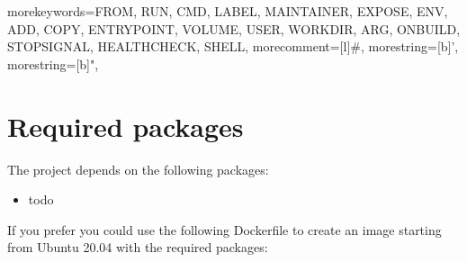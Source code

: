 {
  morekeywords={FROM, RUN, CMD, LABEL, MAINTAINER, EXPOSE, ENV, ADD, COPY,
    ENTRYPOINT, VOLUME, USER, WORKDIR, ARG, ONBUILD, STOPSIGNAL, HEALTHCHECK,
    SHELL},
  morecomment=[l]{\#},
  morestring=[b]',
  morestring=[b]",
}


\chapter{Required packages}

The project depends on the following packages:

\begin{itemize}
    \item todo
\end{itemize}

If you prefer you could use the following Dockerfile to create an image starting from Ubuntu 20.04 with the required packages:

